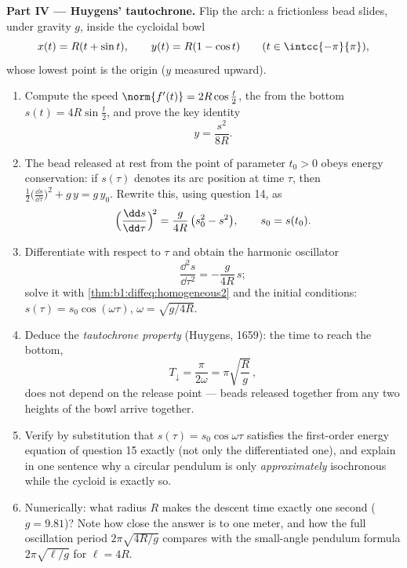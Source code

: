 \begin{problem}
\medskip
\noindent\textbf{Part IV --- Huygens' tautochrone.} Flip the
arch: a frictionless bead slides, under gravity $g$, inside the
cycloidal bowl
\[
x(t) = R(t + \sin t), \qquad y(t) = R(1 - \cos t)
\qquad (t \in \intcc{-\pi}{\pi}),
\]
whose lowest point is the origin ($y$ measured upward).
\begin{enumerate}[resume]
  \item Compute the speed $\norm{f'(t)} = 2R\cos\frac t2$, the
         from the bottom $s(t) = 4R\sin\frac t2$, and
        prove the key identity
        \[
        y = \frac{s^2}{8R} .
        \]
  \item The bead released at rest from the point of parameter
        $t_0 > 0$ obeys energy conservation: if $s(\tau)$ denotes
        its arc position at time $\tau$, then $\frac12\bigl(
        \frac{\dd s}{\dd\tau}\bigr)^2 + g\,y = g\,y_0$. Rewrite
        this, using question 14, as
        \[
        \Bigl(\frac{\dd s}{\dd\tau}\Bigr)^{\!2}
        = \frac{g}{4R}\,\bigl(s_0^2 - s^2\bigr),
        \qquad s_0 = s(t_0).
        \]
  \item Differentiate with respect to $\tau$ and obtain the
        harmonic oscillator
        \[
        \frac{\dd^2 s}{\dd\tau^2} = -\frac{g}{4R}\,s ;
        \]
        solve it with \cref{thm:b1:diffeq:homogeneous2} and the
        initial conditions: $s(\tau) = s_0\cos(\omega\tau)$,
        $\omega = \sqrt{g/4R}$.
  \item Deduce the \emph{tautochrone property} (Huygens, 1659):
        the time to reach the bottom,
        \[
        T_{\downarrow} = \frac{\pi}{2\omega}
        = \pi\sqrt{\frac Rg}\,,
        \]
        does not depend on the release point --- beads released
        together from any two heights of the bowl arrive
        together.
  \item Verify by substitution that $s(\tau) =
        s_0\cos\omega\tau$ satisfies the first-order energy
        equation of question 15 exactly (not only the
        differentiated one), and explain in one sentence why a
        circular pendulum is only \emph{approximately}
        isochronous while the cycloid is exactly so.
  \item Numerically: what radius $R$ makes the descent time
        exactly one second ($g = 9.81$)? Note how close the
        answer is to one meter, and how the full oscillation
        period $2\pi\sqrt{4R/g}$ compares with the small-angle
        pendulum formula $2\pi\sqrt{\ell/g}$ for $\ell = 4R$.
\end{enumerate}


\end{problem}
